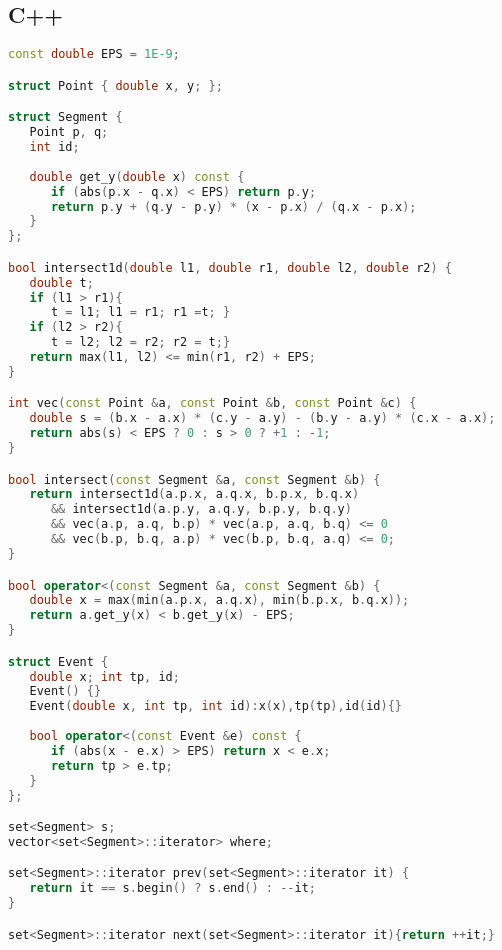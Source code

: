 \subsection{C++}
\begin{lstlisting}[language=C++]
const double EPS = 1E-9;

struct Point { double x, y; };

struct Segment {
   Point p, q;
   int id;
   
   double get_y(double x) const {
      if (abs(p.x - q.x) < EPS) return p.y;
      return p.y + (q.y - p.y) * (x - p.x) / (q.x - p.x);
   }
};

bool intersect1d(double l1, double r1, double l2, double r2) {
   double t;
   if (l1 > r1){
      t = l1; l1 = r1; r1 =t; }
   if (l2 > r2){
      t = l2; l2 = r2; r2 = t;}
   return max(l1, l2) <= min(r1, r2) + EPS;
}

int vec(const Point &a, const Point &b, const Point &c) {
   double s = (b.x - a.x) * (c.y - a.y) - (b.y - a.y) * (c.x - a.x);
   return abs(s) < EPS ? 0 : s > 0 ? +1 : -1;
}

bool intersect(const Segment &a, const Segment &b) {
   return intersect1d(a.p.x, a.q.x, b.p.x, b.q.x)
      && intersect1d(a.p.y, a.q.y, b.p.y, b.q.y)
      && vec(a.p, a.q, b.p) * vec(a.p, a.q, b.q) <= 0
      && vec(b.p, b.q, a.p) * vec(b.p, b.q, a.q) <= 0;
}

bool operator<(const Segment &a, const Segment &b) {
   double x = max(min(a.p.x, a.q.x), min(b.p.x, b.q.x));
   return a.get_y(x) < b.get_y(x) - EPS;
}

struct Event {
   double x; int tp, id;
   Event() {}
   Event(double x, int tp, int id):x(x),tp(tp),id(id){}
   
   bool operator<(const Event &e) const {
      if (abs(x - e.x) > EPS) return x < e.x;
      return tp > e.tp;
   }
};

set<Segment> s;
vector<set<Segment>::iterator> where;

set<Segment>::iterator prev(set<Segment>::iterator it) {
   return it == s.begin() ? s.end() : --it;
}

set<Segment>::iterator next(set<Segment>::iterator it){return ++it;}


\end{lstlisting}
